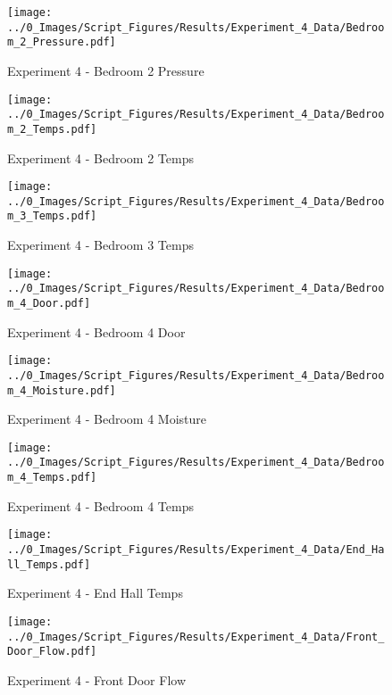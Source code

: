 	\clearpage

	\begin{figure}[H]
		\centering
		\texttt{[image: ../0\_Images/Script\_Figures/Results/Experiment\_4\_Data/Bedroom\_2\_Pressure.pdf]}
		\caption[]{Experiment 4 - Bedroom 2 Pressure}
	\end{figure}
 

	\begin{figure}[H]
		\centering
		\texttt{[image: ../0\_Images/Script\_Figures/Results/Experiment\_4\_Data/Bedroom\_2\_Temps.pdf]}
		\caption[]{Experiment 4 - Bedroom 2 Temps}
	\end{figure}
 
	\clearpage

	\begin{figure}[H]
		\centering
		\texttt{[image: ../0\_Images/Script\_Figures/Results/Experiment\_4\_Data/Bedroom\_3\_Temps.pdf]}
		\caption[]{Experiment 4 - Bedroom 3 Temps}
	\end{figure}
 

	\begin{figure}[H]
		\centering
		\texttt{[image: ../0\_Images/Script\_Figures/Results/Experiment\_4\_Data/Bedroom\_4\_Door.pdf]}
		\caption[]{Experiment 4 - Bedroom 4 Door}
	\end{figure}
 
	\clearpage

	\begin{figure}[H]
		\centering
		\texttt{[image: ../0\_Images/Script\_Figures/Results/Experiment\_4\_Data/Bedroom\_4\_Moisture.pdf]}
		\caption[]{Experiment 4 - Bedroom 4 Moisture}
	\end{figure}
 

	\begin{figure}[H]
		\centering
		\texttt{[image: ../0\_Images/Script\_Figures/Results/Experiment\_4\_Data/Bedroom\_4\_Temps.pdf]}
		\caption[]{Experiment 4 - Bedroom 4 Temps}
	\end{figure}
 
	\clearpage

	\begin{figure}[H]
		\centering
		\texttt{[image: ../0\_Images/Script\_Figures/Results/Experiment\_4\_Data/End\_Hall\_Temps.pdf]}
		\caption[]{Experiment 4 - End Hall Temps}
	\end{figure}
 

	\begin{figure}[H]
		\centering
		\texttt{[image: ../0\_Images/Script\_Figures/Results/Experiment\_4\_Data/Front\_Door\_Flow.pdf]}
		\caption[]{Experiment 4 - Front Door Flow}
	\end{figure}
 
